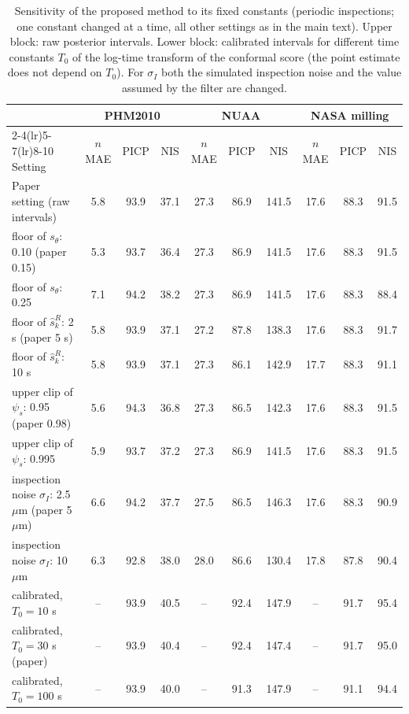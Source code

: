 \begin{table}[!htbp]
\centering
\caption{Sensitivity of the proposed method to its fixed constants (periodic inspections; one constant changed at a time, all other settings as in the main text). Upper block: raw posterior intervals. Lower block: calibrated intervals for different time constants $T_0$ of the log-time transform of the conformal score (the point estimate does not depend on $T_0$). For $\sigma_I$ both the simulated inspection noise and the value assumed by the filter are changed.}
\label{tab:Ssens}
\footnotesize\setlength{\tabcolsep}{3pt}
\begin{tabular}{lccccccccc}
\toprule
 & \multicolumn{3}{c}{PHM2010} & \multicolumn{3}{c}{NUAA} & \multicolumn{3}{c}{NASA milling}\\
\cmidrule(lr){2-4}\cmidrule(lr){5-7}\cmidrule(lr){8-10}
Setting & $n$MAE & PICP & NIS & $n$MAE & PICP & NIS & $n$MAE & PICP & NIS\\
\midrule
Paper setting (raw intervals) & 5.8 & 93.9 & 37.1 & 27.3 & 86.9 & 141.5 & 17.6 & 88.3 & 91.5\\
floor of $s_\theta$: 0.10 (paper 0.15) & 5.3 & 93.7 & 36.4 & 27.3 & 86.9 & 141.5 & 17.6 & 88.3 & 91.5\\
floor of $s_\theta$: 0.25 & 7.1 & 94.2 & 38.2 & 27.3 & 86.9 & 141.5 & 17.6 & 88.3 & 88.4\\
floor of $\hat s^R_k$: 2 s (paper 5 s) & 5.8 & 93.9 & 37.1 & 27.2 & 87.8 & 138.3 & 17.6 & 88.3 & 91.7\\
floor of $\hat s^R_k$: 10 s & 5.8 & 93.9 & 37.1 & 27.3 & 86.1 & 142.9 & 17.7 & 88.3 & 91.1\\
upper clip of $\psi_s$: 0.95 (paper 0.98) & 5.6 & 94.3 & 36.8 & 27.3 & 86.5 & 142.3 & 17.6 & 88.3 & 91.5\\
upper clip of $\psi_s$: 0.995 & 5.9 & 93.7 & 37.2 & 27.3 & 86.9 & 141.5 & 17.6 & 88.3 & 91.5\\
inspection noise $\sigma_I$: 2.5 $\mu$m (paper 5 $\mu$m) & 6.6 & 94.2 & 37.7 & 27.5 & 86.5 & 146.3 & 17.6 & 88.3 & 90.9\\
inspection noise $\sigma_I$: 10 $\mu$m & 6.3 & 92.8 & 38.0 & 28.0 & 86.6 & 130.4 & 17.8 & 87.8 & 90.4\\
\midrule
calibrated, $T_0=10$ s & -- & 93.9 & 40.5 & -- & 92.4 & 147.9 & -- & 91.7 & 95.4\\
calibrated, $T_0=30$ s (paper) & -- & 93.9 & 40.4 & -- & 92.4 & 147.4 & -- & 91.7 & 95.0\\
calibrated, $T_0=100$ s & -- & 93.9 & 40.0 & -- & 91.3 & 147.9 & -- & 91.1 & 94.4\\
\bottomrule
\end{tabular}
\end{table}
